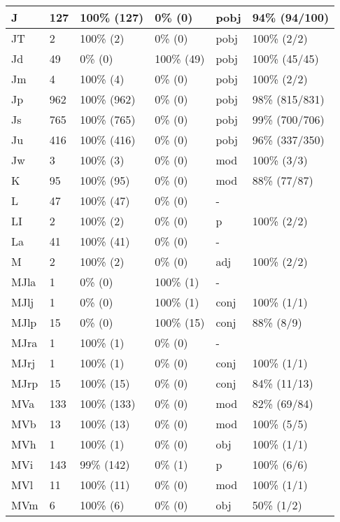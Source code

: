 \begin{figure*}
\begin{tabular}{|l|l|l|l||l|l|}
\hline
 J & 127 & 100\% (127) & 0\% (0) & pobj & 94\% (94/100) \\ 
\hline
 JT & 2 & 100\% (2) & 0\% (0) & pobj & 100\% (2/2) \\ 
\hline
 Jd & 49 & 0\% (0) & 100\% (49) & pobj & 100\% (45/45) \\ 
\hline
 Jm & 4 & 100\% (4) & 0\% (0) & pobj & 100\% (2/2) \\ 
\hline
 Jp & 962 & 100\% (962) & 0\% (0) & pobj & 98\% (815/831) \\ 
\hline
 Js & 765 & 100\% (765) & 0\% (0) & pobj & 99\% (700/706) \\ 
\hline
 Ju & 416 & 100\% (416) & 0\% (0) & pobj & 96\% (337/350) \\ 
\hline
 Jw & 3 & 100\% (3) & 0\% (0) & mod & 100\% (3/3) \\ 
\hline
 K & 95 & 100\% (95) & 0\% (0) & mod & 88\% (77/87) \\ 
\hline
 L & 47 & 100\% (47) & 0\% (0) & - &  \\ 
\hline
 LI & 2 & 100\% (2) & 0\% (0) & p & 100\% (2/2) \\ 
\hline
 La & 41 & 100\% (41) & 0\% (0) & - &  \\ 
\hline
 M & 2 & 100\% (2) & 0\% (0) & adj & 100\% (2/2) \\ 
\hline
 MJla & 1 & 0\% (0) & 100\% (1) & - &  \\ 
\hline
 MJlj & 1 & 0\% (0) & 100\% (1) & conj & 100\% (1/1) \\ 
\hline
 MJlp & 15 & 0\% (0) & 100\% (15) & conj & 88\% (8/9) \\ 
\hline
 MJra & 1 & 100\% (1) & 0\% (0) & - &  \\ 
\hline
 MJrj & 1 & 100\% (1) & 0\% (0) & conj & 100\% (1/1) \\ 
\hline
 MJrp & 15 & 100\% (15) & 0\% (0) & conj & 84\% (11/13) \\ 
\hline
 MVa & 133 & 100\% (133) & 0\% (0) & mod & 82\% (69/84) \\ 
\hline
 MVb & 13 & 100\% (13) & 0\% (0) & mod & 100\% (5/5) \\ 
\hline
 MVh & 1 & 100\% (1) & 0\% (0) & obj & 100\% (1/1) \\ 
\hline
 MVi & 143 & 99\% (142) & 0\% (1) & p & 100\% (6/6) \\ 
\hline
 MVl & 11 & 100\% (11) & 0\% (0) & mod & 100\% (1/1) \\ 
\hline
 MVm & 6 & 100\% (6) & 0\% (0) & obj & 50\% (1/2) \\ 
\hline
\end{tabular}
\end{figure*}
